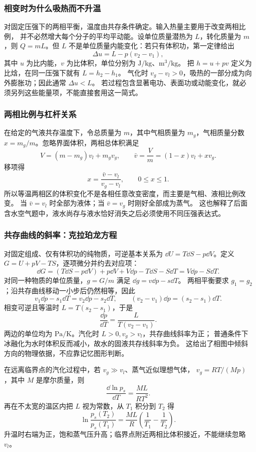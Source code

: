 \subsubsection*{相变时为什么吸热而不升温}

对固定压强下的两相平衡，温度由共存条件确定。输入热量主要用于改变两相比例，
并不必然增大每个分子的平均平动能。设单位质量潜热为 $L$，转化质量为 $m$，则
$Q=mL$。但 $L$ 不是单位质量内能变化：若只有体积功，第一定律给出
\begin{equation}
 \Delta u=L-p(v_2-v_1),
\end{equation}
其中 $u$ 为比内能，$v$ 为比体积，单位分别为 $\mathrm{J/kg}$、$\mathrm{m^3/kg}$。
把 $h=u+pv$ 定义为比焓，在同一压强下就有 $L=h_2-h_1$。
气化时 $v_g-v_l>0$，吸热的一部分成为向外膨胀功；因此通常 $\Delta u<L$。
若过程包含显著电功、表面功或动能变化，就必须另列这些能量项，不能直接套用这一简式。

\subsubsection*{两相比例与杠杆关系}

在给定的气液共存温度下，令总质量为 $m$，其中气相质量为 $m_g$，气相质量分数
$x=m_g/m$。忽略界面体积，两相总体积满足
\[
 V=(m-m_g)v_l+m_gv_g,
 \qquad \bar v=\frac Vm=(1-x)v_l+xv_g.
\]
移项得
\begin{equation}
 x=\frac{\bar v-v_l}{v_g-v_l},\qquad 0\le x\le1.
\end{equation}
所以等温两相区的体积变化不是各相任意改变密度，而主要是气相、液相比例改变。
当 $\bar v=v_l$ 时全部为液体；当 $\bar v=v_g$ 时刚好全部成为蒸气。
这也解释了后面含水空气题中，液水尚存与液水恰好消失之后必须使用不同压强表达式。

\subsubsection*{共存曲线的斜率：克拉珀龙方程}

对固定组成、仅有体积功的纯物质，可逆基本关系为
$\dd U=T\dd S-p\dd V$。定义 $G=U+pV-TS$，逐项微分并约去对应项：
\[
 \dd G=(T\dd S-p\dd V)+p\dd V+V\dd p-T\dd S-S\dd T
 =V\dd p-S\dd T.
\]
对同一种物质的单位质量，$g=G/m$ 满足 $\dd g=v\dd p-s\dd T$。
两相平衡要求 $g_1=g_2$；沿共存曲线移动一小步后仍然相等，因此
\[
 v_1\dd p-s_1\dd T=v_2\dd p-s_2\dd T,
 \qquad (v_2-v_1)\dd p=(s_2-s_1)\dd T.
\]
相变可逆且等温时 $L=T(s_2-s_1)$，于是
\begin{equation}
 \frac{\dd p}{\dd T}=\frac{L}{T(v_2-v_1)}.
\end{equation}
两边的单位均为 $\mathrm{Pa/K}$。汽化时 $L>0,v_g>v_l$，共存曲线斜率为正；
普通条件下冰融化为水时体积反而减小，故水的固液共存线斜率为负。
这给出了相图中倾斜方向的物理依据，不应靠记忆图形判断。

在远离临界点的汽化过程中，若 $v_g\gg v_l$、蒸气近似理想气体，
$v_g=RT/(Mp)$，其中 $M$ 是摩尔质量，则
\[
 \frac{\dd\ln p_s}{\dd T}=\frac{ML}{RT^2}.
\]
再在不太宽的温区内把 $L$ 视为常数，从 $T_1$ 积分到 $T_2$ 得
\begin{equation}
 \ln\frac{p_s(T_2)}{p_s(T_1)}
 =\frac{ML}{R}\left(\frac1{T_1}-\frac1{T_2}\right).
\end{equation}
升温时右端为正，饱和蒸气压升高；临界点附近两相比体积接近，不能继续忽略 $v_l$。
